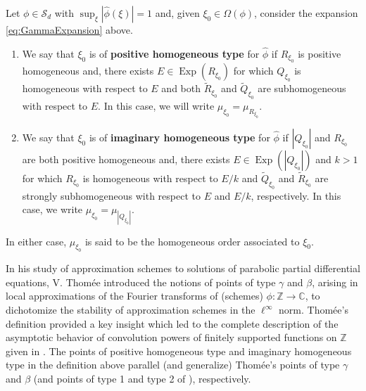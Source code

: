 \documentclass[smallextended]{svjour3}
\theoremstyle{remark}
\newcommand\Exp{\operatorname{Exp}}
\begin{document}
\begin{definition}\label{def:Types}
Let $\phi\in\mathcal{S}_d$ with $\sup_{\xi}|\widehat{\phi}(\xi)|=1$ and, given $\xi_0\in\Omega(\phi)$, consider the expansion \eqref{eq:GammaExpansion} above.
\begin{enumerate}
    \item We say that $\xi_0$ is of \textbf{positive homogeneous type} for $\widehat{\phi}$ if $R_{\xi_0}$ is positive homogeneous and, there exists $E\in \Exp(R_{\xi_0})$ for which $Q_{\xi_0}$ is homogeneous with respect to $E$ and both $\widetilde{R}_{\xi_0}$ and $\widetilde{Q}_{\xi_0}$ are subhomogeneous with respect to $E$. In this case, we will write  $\mu_{\xi_0}=\mu_{R_{\xi_0}}$.
\item We say that $\xi_0$ is of \textbf{imaginary homogeneous type} for $\widehat{\phi}$ if $|Q_{\xi_0}|$ and $R_{\xi_0}$ are both positive homogeneous and, there exists $E\in\Exp(|Q_{\xi_0}|)$ and $k>1$ for which $R_{\xi_0}$ is homogeneous with respect to $E/k$ and $\widetilde{Q}_{\xi_0}$ and $\widetilde{R}_{\xi_0}$ are strongly subhomogeneous with respect to $E$ and $E/k$, respectively. In this case, we write $\mu_{\xi_0}=\mu_{|Q_{\xi_0}|}$.
\end{enumerate}
In either case, $\mu_{\xi_0}$ is said to be the homogeneous order associated to $\xi_0$.
\end{definition}


\noindent In his study of approximation schemes to solutions of parabolic partial differential equations, V. Thom\'{e}e introduced the notions of points of type $\gamma$ and $\beta$, arising in local approximations of the Fourier transforms of (schemes) $\phi:\mathbb{Z}\to\mathbb{C}$, to dichotomize the stability of approximation schemes in the $\ell^\infty$ norm\cite{thomee_stability_1965}. Thom\'{e}e's definition provided a key insight which led to the complete description of the asymptotic behavior of convolution powers of finitely supported functions on $\mathbb{Z}$ given in \cite{randles_convolution_2015}. The points of positive homogeneous type and imaginary homogeneous type in the definition above parallel (and generalize) Thom\'{e}e's points of type $\gamma$ and $\beta$ (and points of type 1 and type 2 of \cite{randles_convolution_2015}), respectively.\\
\end{document}
